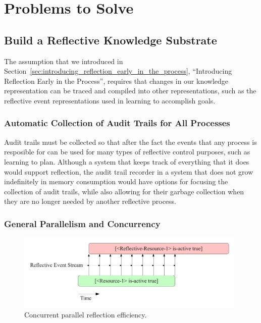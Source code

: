 \chapter{Problems to Solve}\label{ch:problems_to_solve}

\section{Build a Reflective Knowledge Substrate}

The assumption that we introduced in
Section~\ref{sec:introducing_reflection_early_in_the_process},
``Introducing Reflection Early in the Process'', requires that changes
in our knowledge representation can be traced and compiled into other
representations, such as the reflective event representations used in
learning to accomplish goals.

\subsection{Automatic Collection of Audit Trails for All Processes}

Audit trails must be collected so that after the fact the events that
any process is resposible for can be used for many types of reflective
control purposes, such as learning to plan.  Although a system that
keeps track of everything that it does would support reflection, the
audit trail recorder in a system that does not grow indefinitely in
memory consumption would have options for focusing the collection of
audit trails, while also allowing for their garbage collection when
they are no longer needed by another reflective process.

\subsection{General Parallelism and Concurrency}

\begin{figure}[bth]
  \center
  \includegraphics[width=11cm]{gfx/concurrent_parallel_reflection_efficiency}
  \caption[Concurrent parallel reflection efficiency]{Concurrent parallel reflection efficiency.}
  \label{fig:concurrent_parallel_reflection_efficiency}
\end{figure}

